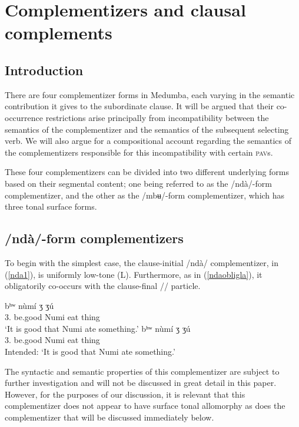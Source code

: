 \documentclass[output=paper,colorlinks,citecolor=brown]{langscibook}
\begin{document}
\section{Complementizers and clausal complements}
\subsection{Introduction}

There are four complementizer forms in Medumba, each varying in the semantic contribution it gives to the subordinate clause. It will be argued that their co-occurrence restrictions arise principally from incompatibility between the semantics of the complementizer and the semantics of the subsequent selecting verb. We will also argue for a compositional account regarding the semantics of the complementizers responsible for this incompatibility with certain \textsc{pav}s.

These four complementizers can be divided into two different underlying forms based on their segmental content; one being referred to as the /nd{à}/-form complementizer, and the other as the /mbʉ/-form complementizer, which has three tonal surface forms.


\subsection{/nd{à}/-form complementizers}

To begin with the simplest case, the clause-initial /nd{à}/ complementizer, in (\ref{nda1}), is uniformly low-tone (L). Furthermore, as in (\ref{ndaobligla}), it obligatorily co-occurs with the clause-final /\la/ particle.

\ea \label{nda1}
    \begin{xlist}
    \ex \label{ndaobligla}
         {bʰʷ\ooL\ooH}     {\nda} {n{ù}m{í}} {ʒ\baruH\baruL} {ʒ{ú}} {\la} \\
             {3.} {be.good} {} {Numi} {eat} {thing} {} \\
        \glt `It is good that Numi ate something.'
    \ex
         {bʰʷ\ooL\ooH} {\nda} {n{ù}m{í}} {ʒ\baruH\baruL} {ʒ{ú}} \\
             {3.} {be.good} {} {Numi} {eat} {thing} \\
        \glt Intended: `It is good that Numi ate something.'
    \end{xlist}
\z

The syntactic and semantic properties of this complementizer are subject to further investigation and will not be discussed in great detail in this paper. However, for the purposes of our discussion, it is relevant that this complementizer does not appear to have surface tonal allomorphy as does the complementizer that will be discussed immediately below.
\end{document}
